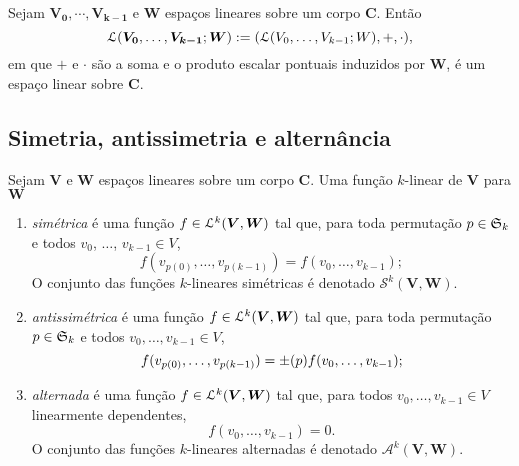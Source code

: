 \begin{proposition}
Sejam $\bm{V_0},\cdots,\bm{V_{k-1}}$ e $\bm W$ espaços lineares sobre um corpo $\bm C$. Então
	\begin{equation*}
	\mathcal{L}(\bm{V_0},\ldots,\bm{V_{k-1}};\bm W) := (\mathcal{L}(V_0,\ldots,V_{k-1};W),+,\cdot),
	\end{equation*}
em que $+$ e $\cdot$ são a soma e o produto escalar pontuais induzidos por $\bm W$, é um espaço linear sobre $\bm C$.
\end{proposition}


\subsection{Simetria, antissimetria e alternância}

\begin{definition}
Sejam $\bm V$ e $\bm W$ espaços lineares sobre um corpo $\bm C$. Uma função $k$-linear de $\bm V$ para $\bm W$
\begin{enumerate}
	\item \emph{simétrica} é uma função $f \in \mathcal{L}^k(\bm V,\bm W)$ tal que, para toda permutação $p \in \mathfrak{S}_k$ e todos $v_0$, $\ldots$, $v_{k-1} \in V$,
	\begin{equation*}
	f(v_{p(0)},\ldots,v_{p(k-1)}) = f(v_0,\ldots,v_{k-1});
	\end{equation*}
O conjunto das funções $k$-lineares simétricas é denotado $\mathcal S^k(\bm V,\bm W)$.
	\item \emph{antissimétrica} é uma função $f \in \mathcal{L}^k(\bm V,\bm W)$ tal que, para toda permutação $p \in \mathfrak{S}_k$ e todos $v_0,\ldots,v_{k-1} \in V$,
	\begin{equation*}
	f(v_{p(0)},\ldots,v_{p(k-1)}) = \mathord{\pm}(p) f(v_0,\ldots,v_{k-1});
	\end{equation*}
	\item \emph{alternada} é uma função $f \in \mathcal{L}^k(\bm V,\bm W)$ tal que, para todos $v_0,\ldots,v_{k-1} \in V$ linearmente dependentes,
	\begin{equation*}
	f(v_0,\ldots,v_{k-1}) = 0.
	\end{equation*}
O conjunto das funções $k$-lineares alternadas é denotado $\mathcal A^k(\bm V,\bm W)$.
\end{enumerate}
\end{definition}

